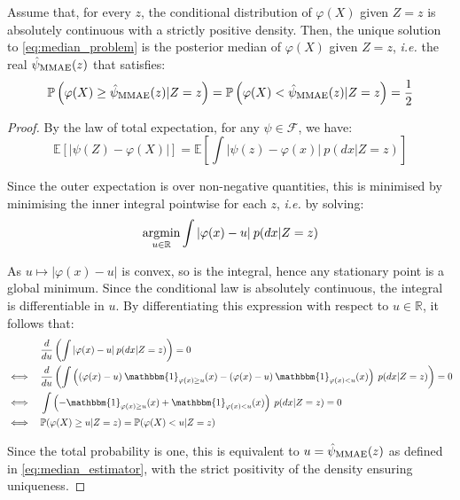\begin{proposition}
	Assume that, for every $z$, the conditional distribution of $\varphi(X)$ given $Z=z$ is absolutely continuous with a strictly positive density. Then, the unique solution to \eqref{eq:median_problem} is the posterior median of $\varphi(X)$ given $Z=z$, \textit{i.e.} the real $\hat{\psi}_{\textup{MMAE}}(z)$ that satisfies:
	\begin{equation}
		\mathbb{P}\left(\varphi(X)\geq\hat{\psi}_{\textup{MMAE}}(z)|Z=z\right)=\mathbb{P}\left(\varphi(X)<\hat{\psi}_{\textup{MMAE}}(z)|Z=z\right)=\frac{1}{2}\label{eq:median_estimator}
	\end{equation}
\end{proposition}

\begin{proof}
	By the law of total expectation, for any $\psi\in\mathcal{F}$, we have:
	\begin{equation}
		\mathbb{E}[|\psi(Z)-\varphi(X)|]=\mathbb{E}\left[\int{|\psi(z)-\varphi(x)|\:p(dx|Z=z)}\right]
	\end{equation}

	Since the outer expectation is over non-negative quantities, this is minimised by minimising the inner integral pointwise for each $z$, \textit{i.e.} by solving:
	\begin{equation}
		\underset{u\in\mathbb{R}}{\textup{argmin}}\int{|\varphi(x)-u|\:p(dx|Z=z)}\label{eq:median_pointwise}
	\end{equation}

	As $u\mapsto|\varphi(x)-u|$ is convex, so is the integral, hence any stationary point is a global minimum. Since the conditional law is absolutely continuous, the integral is differentiable in $u$. By differentiating this expression with respect to $u\in\mathbb{R}$, it follows that:
	\begin{equation}
		\begin{aligned}
		&\frac{d}{du}\left(\int{|\varphi(x)-u|\:p(dx|Z=z)}\right)=0\\
		\iff\quad&\frac{d}{du}\left(\int{\left((\varphi(x)-u)\:\mathbbm{1}_{\varphi(x)\geq u}(x)-(\varphi(x)-u)\:\mathbbm{1}_{\varphi(x)<u}(x)\right)\:p(dx|Z=z)}\right)=0\\
		\iff\quad&\int{\left(-\mathbbm{1}_{\varphi(x)\geq u}(x)+\mathbbm{1}_{\varphi(x)<u}(x)\right)\:p(dx|Z=z)}=0\\
		\iff\quad&\mathbb{P}(\varphi(X)\geq u|Z=z)=\mathbb{P}(\varphi(X)<u|Z=z)
		\end{aligned}
	\end{equation}

	Since the total probability is one, this is equivalent to $u=\hat{\psi}_{\textup{MMAE}}(z)$ as defined in \eqref{eq:median_estimator}, with the strict positivity of the density ensuring uniqueness.
\end{proof}

